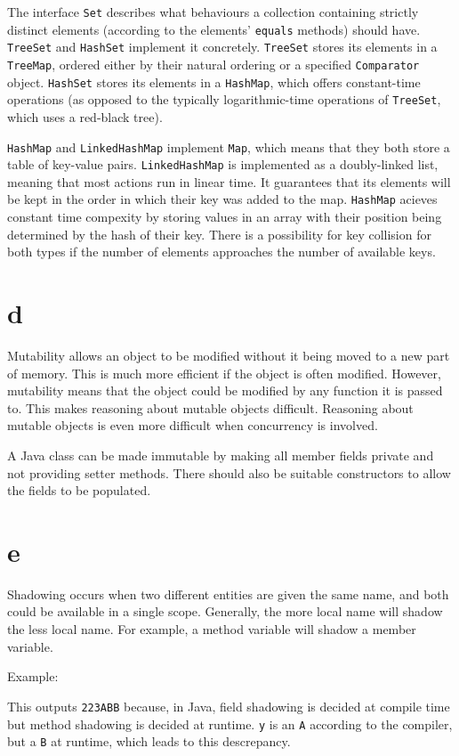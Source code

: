 \documentclass[11pt]{article}
\begin{document}
The interface \texttt{Set} describes what behaviours a collection containing strictly distinct elements (according to the elements' \texttt{equals} methods) should have. \texttt{TreeSet} and \texttt{HashSet} implement it concretely. \texttt{TreeSet} stores its elements in a \texttt{TreeMap}, ordered either by their natural ordering or a specified \texttt{Comparator} object. \texttt{HashSet} stores its elements in a \texttt{HashMap}, which offers constant-time operations (as opposed to the typically logarithmic-time operations of \texttt{TreeSet}, which uses a red-black tree).

\texttt{HashMap} and \texttt{LinkedHashMap} implement \texttt{Map}, which means that they both store a table of key-value pairs. \texttt{LinkedHashMap} is implemented as a doubly-linked list, meaning that most actions run in linear time. It guarantees that its elements will be kept in the order in which their key was added to the map. \texttt{HashMap} acieves constant time compexity by storing values in an array with their position being determined by the hash of their key. There is a possibility for key collision for both types if the number of elements approaches the number of available keys.

\section*{d}
Mutability allows an object to be modified without it being moved to a new part of memory. This is much more efficient if the object is often modified. However, mutability means that the object could be modified by any function it is passed to. This makes reasoning about mutable objects difficult. Reasoning about mutable objects is even more difficult when concurrency is involved.

A Java class can be made immutable by making all member fields private and not providing setter methods. There should also be suitable constructors to allow the fields to be populated.

\section*{e}
Shadowing occurs when two different entities are given the same name, and both could be available in a single scope. Generally, the more local name will shadow the less local name. For example, a method variable will shadow a member variable.

Example:

This outputs \texttt{223ABB} because, in Java, field shadowing is decided at compile time but method shadowing is decided at runtime. \texttt y is an \texttt A according to the compiler, but a \texttt B at runtime, which leads to this descrepancy.
\end{document}
